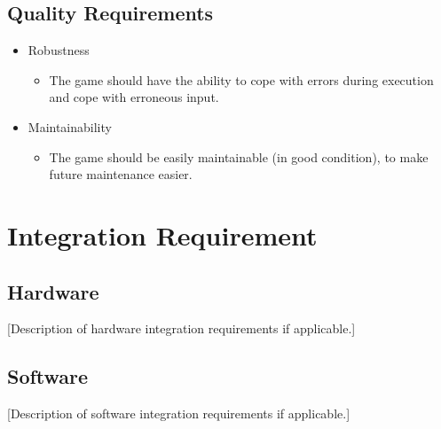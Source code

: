 \documentclass{article}
\begin{document}
   \subsection{Quality Requirements} 
   \begin{itemize}
    \item Robustness
		\begin{itemize}
			\item The game should have the ability to cope with errors during execution and cope with erroneous input.
	    		
	    \end{itemize}
	    
	    \item Maintainability
		\begin{itemize}
			\item The game should be easily maintainable (in good condition), to make future maintenance easier.
         \end{itemize}
        \end{itemize}
   
  \section{Integration Requirement}
    \subsection{Hardware}
    [Description of hardware integration requirements if applicable.]
    \subsection{Software}
    [Description of software integration requirements if applicable.]
   
\end{document}
